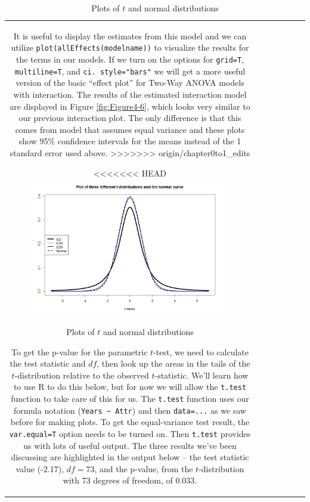 \documentclass[]{book}
\theoremstyle{definition}
\theoremstyle{definition}
\theoremstyle{remark}
\begin{document}
\begin{longtable}[]{@{}ccccccc@{}}
\begin{minipage}[b]{0.10\columnwidth}
It is useful to display the estimates from this model and we can utilize
\texttt{plot(allEffects(modelname))} to visualize the results for the
terms in our models. If we turn on the options for \texttt{grid=T},
\texttt{multiline=T}, and \texttt{ci.\ style="bars"} we will get a more
useful version of the basic ``effect plot'' for Two-Way ANOVA models
with interaction. The results of the estimated interaction model are
displayed in Figure \ref{fig:Figure4-6}, which looks very similar to our
previous interaction plot. The only difference is that this comes from
model that assumes equal variance and these plots show 95\% confidence
intervals for the means instead of the 1 standard error used above.
>>>>>>> origin/chapter0to1_edits



\begin{figure}
\centering
<<<<<<< HEAD
\includegraphics{chapter1_files/image045small.png}
\caption{\label{fig:Figure2-13}Plots of \(t\) and normal distributions}
\end{figure}

To get the p-value for the parametric \(t\)-test, we need to calculate
the test statistic and \(df\), then look up the areas in the tails of
the \(t\)-distribution relative to the observed \(t\)-statistic. We'll
learn how to use R to do this below, but for now we will allow the
\texttt{t.test} function to take care of this for us. The
\texttt{t.test} function uses our formula notation
(\texttt{Years\ \textasciitilde{}\ Attr}) and then \texttt{data=...} as
we saw before for making plots. To get the equal-variance test result,
the \texttt{var.equal=T} option needs to be turned on. Then
\texttt{t.test} provides us with lots of useful output. The three
results we've been discussing are highlighted in the output below -- the
test statistic value (-2.17), \(df=73\), and the p-value, from the
\(t\)-distribution with 73 degrees of freedom, of 0.033.


\end{minipage}
\end{longtable}
\end{document}
